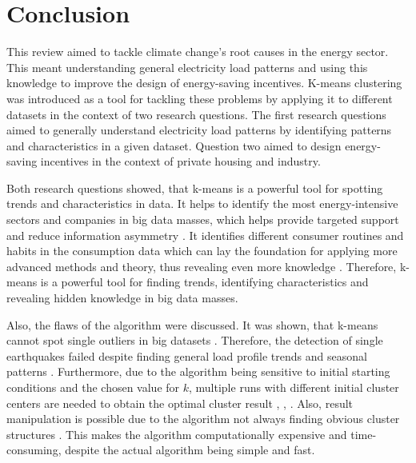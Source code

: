 \section{Conclusion}
\label{cha:conclusion}



This review aimed to tackle climate change's root causes in the energy sector.
This meant understanding general electricity load patterns and using this knowledge to improve the design of energy-saving incentives.
K-means clustering was introduced as a tool for tackling these problems by applying it to different datasets in the context of two research questions.
The first research questions aimed to generally understand electricity load patterns by identifying patterns and characteristics in a given dataset.
Question two aimed to design energy-saving incentives in the context of private housing and industry.

Both research questions showed, that k-means is a powerful tool for spotting trends and characteristics in data.
It helps to identify the most energy-intensive sectors and companies in big data masses, which helps provide targeted support and reduce information asymmetry \cite{LIU-BDE}.
It identifies different consumer routines and habits in the consumption data which can lay the foundation for applying more advanced methods and theory, thus revealing even more knowledge \cite{MAL-HBP}.
Therefore, k-means is a powerful tool for finding trends, identifying characteristics and revealing hidden knowledge in big data masses.

Also, the flaws of the algorithm were discussed.
It was shown, that k-means cannot spot single outliers in big datasets \cite{JES-IND}.
Therefore, the detection of single earthquakes failed despite finding general load profile trends and seasonal patterns \cite{JES-IND}.
Furthermore, due to the algorithm being sensitive to initial starting conditions and the chosen value for $k$, multiple runs with different initial cluster centers are needed to obtain the optimal cluster result \cite{JAI-DCB}, \cite{EZU-CPF}, \cite{BAR-LVG}.
Also, result manipulation is possible due to the algorithm not always finding obvious cluster structures \cite{BOU-RPK}.
This makes the algorithm computationally expensive and time-consuming, despite the actual algorithm being simple and fast.

